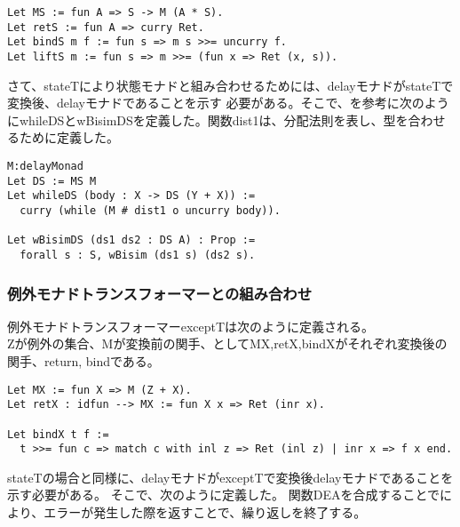 \documentclass[japanese]{jssst_ppl}
\theoremstyle{definition}
\def\coqin#1{\text{\texttt{#1}}}
\begin{document}
  \begin{verbatim}
Let MS := fun A => S -> M (A * S).
Let retS := fun A => curry Ret.
Let bindS m f := fun s => m s >>= uncurry f.
Let liftS m := fun s => m >>= (fun x => Ret (x, s)).
        \end{verbatim}

  さて、stateTにより状態モナドと組み合わせるためには、delayモナドがstateTで変換後、delayモナドであることを示す
  必要がある。そこで、\cite{d}を参考に次のようにwhileDSとwBisimDSを定義した。関数dist1は、分配法則を表し、型を合わせるために定義した。
  \iffalse
    そこで、次の定理を用いた。\\

    随伴にcurryとuncurryを

    特に状態モナドが随伴$(- \otimes A) \vdash (A \rightarrow - )$から導出されるため次のように
    while operatorとwBisimを定義した。関数dist1は、分配法則を表し、型を合わせるために定義した。
  \fi

  \begin{verbatim}
M:delayMonad
Let DS := MS M
Let whileDS (body : X -> DS (Y + X)) :=
  curry (while (M # dist1 o uncurry body)).

Let wBisimDS (ds1 ds2 : DS A) : Prop :=
  forall s : S, wBisim (ds1 s) (ds2 s).
          \end{verbatim}




  \subsubsection{例外モナドトランスフォーマーとの組み合わせ}
  例外モナドトランスフォーマーexceptTは次のように定義される。\\
  Zが例外の集合、Mが変換前の関手、としてMX,retX,bindXがそれぞれ変換後の関手、return, bindである。

  \begin{verbatim}
Let MX := fun X => M (Z + X).
Let retX : idfun --> MX := fun X x => Ret (inr x).

Let bindX t f :=
  t >>= fun c => match c with inl z => Ret (inl z) | inr x => f x end.
        \end{verbatim}
  stateTの場合と同様に、delayモナドがexceptTで変換後delayモナドであることを示す必要がある。
  そこで、次のように定義した。
  関数DEAを合成することでにより、エラーが発生した際\coqin{inl (inl u)}を返すことで、繰り返しを終了する。
\end{document}
